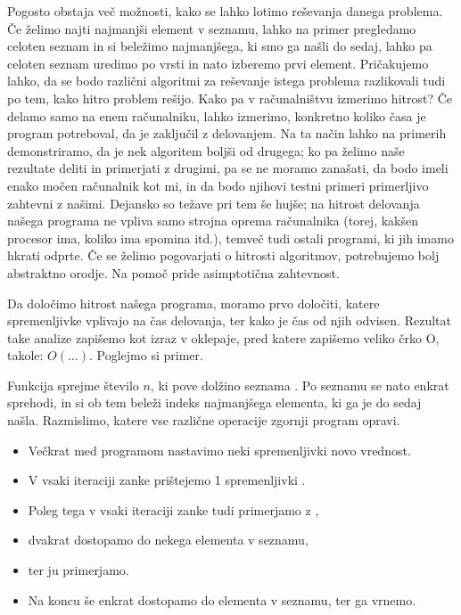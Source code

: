 
Pogosto obstaja več možnosti, kako se lahko lotimo reševanja danega problema.
Če želimo najti najmanjši element v seznamu, lahko na primer pregledamo celoten
seznam in  si beležimo najmanjšega, ki smo ga našli do sedaj, lahko pa celoten
seznam uredimo po vrsti in nato izberemo prvi element.
Pričakujemo lahko, da se bodo različni algoritmi za reševanje istega problema
razlikovali tudi po tem, kako hitro problem rešijo.
Kako pa v računalništvu izmerimo hitrost? Če delamo samo na enem računalniku,
lahko izmerimo, konkretno koliko časa je program potreboval, da je zaključil
z delovanjem.
Na ta način lahko na primerih demonstriramo, da je nek algoritem boljši od
drugega; ko pa želimo naše rezultate deliti in primerjati z drugimi,
pa se ne moramo zanašati, da bodo imeli enako močen računalnik kot mi, in da
bodo njihovi testni primeri primerljivo zahtevni z našimi.
Dejansko so težave pri tem še hujše; na hitrost delovanja našega programa ne
vpliva samo strojna oprema računalnika (torej, kakšen procesor ima, koliko ima
spomina itd.), temveč tudi ostali programi, ki jih imamo hkrati odprte.
Če se želimo pogovarjati o hitrosti algoritmov, potrebujemo bolj abstraktno
orodje.
Na pomoč pride asimptotična zahtevnost.

Da določimo hitrost našega programa, moramo prvo določiti, katere spremenljivke
vplivajo na čas delovanja, ter kako je čas od njih odvisen.
Rezultat take analize zapišemo kot izraz v oklepaje, pred katere zapišemo
veliko črko O, takole: $O(\ldots)$.
Poglejmo si primer.


Funkcija  sprejme število $n$, ki pove dolžino seznama
.
Po seznamu se nato enkrat sprehodi, in si ob tem beleži indeks najmanjšega
elementa, ki ga je do sedaj našla.
Razmislimo, katere vse različne operacije zgornji program opravi.
\begin{itemize}
\item 
  Večkrat med programom nastavimo neki spremenljivki novo vrednost.
\item
  V vsaki iteraciji zanke prištejemo 1 spremenljivki .
\item
  Poleg tega v vsaki iteraciji zanke tudi primerjamo  z ,
\item
  dvakrat dostopamo do nekega elementa v seznamu,
\item
  ter ju primerjamo.
\item
  Na koncu še enkrat dostopamo do elementa v seznamu, ter ga vrnemo.
\end{itemize}

